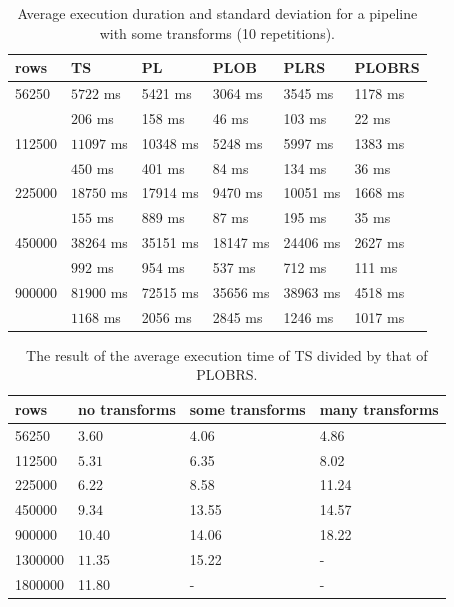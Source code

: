 \begin{table}[H]
	\caption{Average execution duration and standard deviation for a pipeline with some transforms (10 repetitions).}
	\label{tab:eval:many}
	\begin{center}
		\begin{tabular}{|l|l|l|l|l|l|}
			\hline
			rows   & TS         & PL       & PLOB     & PLRS     & PLOBRS  \\
			\hline
			\hline
			56250  & $5722$ ms  & 5421 ms  & 3064 ms  & 3545 ms  & 1178 ms \\
			       & $206$ ms   & 158 ms   & 46 ms    & 103 ms   & 22 ms   \\
			\hline
			112500 & $11097$ ms & 10348 ms & 5248 ms  & 5997 ms  & 1383 ms \\
			       & $450$ ms   & 401 ms   & 84 ms    & 134 ms   & 36 ms   \\
			\hline
			225000 & $18750$ ms & 17914 ms & 9470 ms  & 10051 ms & 1668 ms \\
			       & $155$ ms   & 889 ms   & 87 ms    & 195 ms   & 35 ms   \\
			\hline
			450000 & $38264$ ms & 35151 ms & 18147 ms & 24406 ms & 2627 ms \\
			       & $992$ ms   & 954 ms   & 537 ms   & 712 ms   & 111 ms  \\
			\hline
			900000 & $81900$ ms & 72515 ms & 35656 ms & 38963 ms & 4518 ms \\
			       & $1168$ ms  & 2056 ms  & 2845 ms  & 1246 ms  & 1017 ms \\
			\hline
		\end{tabular}
	\end{center}
\end{table}


\begin{table}[H]
	\caption{The result of the average execution time of TS divided by that of PLOBRS.}
	\label{tab:eval:ts_div_by_plobrs}
	\begin{center}
		\begin{tabular}{|l|l|l|l|}
			\hline
			rows    & no transforms & some transforms & many transforms \\
			\hline
			56250   & $3.60$        & 4.06            & 4.86            \\
			112500  & $5.31$        & 6.35            & 8.02            \\
			225000  & 6.22          & 8.58            & 11.24           \\
			450000  & $9.34$        & 13.55           & 14.57           \\
			900000  & 10.40         & 14.06           & 18.22           \\
			1300000 & $11.35$       & 15.22           & -               \\
			1800000 & 11.80         & -               & -               \\
			\hline
		\end{tabular}
	\end{center}
\end{table}


